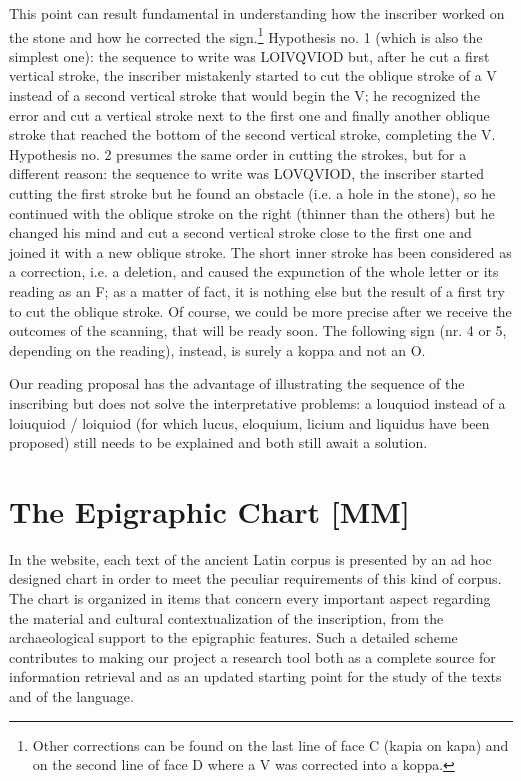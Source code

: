 \documentclass[amsthm,ebook]{saparticle}
\begin{document}
This point can result fundamental in understanding how the inscriber worked on the stone and how he corrected the
sign.\footnote{Other corrections can be found on the last line of face C (kapia on kapa) and on the second line of face
D where a V was corrected into a koppa. } Hypothesis no. 1 (which is also the simplest one): the sequence to write was
LOIVQVIOD but, after he cut a first vertical stroke, the inscriber mistakenly started to cut the oblique stroke of a V
instead of a second vertical stroke that would begin the V; he recognized the error and cut a vertical stroke next to
the first one and finally another oblique stroke that reached the bottom of the second vertical stroke, completing the
V. Hypothesis no. 2 presumes the same order in cutting the strokes, but for a different reason: the sequence to write
was LOVQVIOD, the inscriber started cutting the first stroke but he found an obstacle (i.e. a hole in the stone), so he
continued with the oblique stroke on the right (thinner than the others) but he changed his mind and cut a second
vertical stroke close to the first one and joined it with a new oblique stroke. The short inner stroke has been
considered as a correction, i.e. a deletion, and caused the expunction of the whole letter or its reading as an F; as a
matter of fact, it is nothing else but the result of a first try to cut the oblique stroke. Of course, we could be more
precise after we receive the outcomes of the scanning, that will be ready soon. The following sign (nr. 4 or 5,
depending on the reading), instead, is surely a koppa and not an O.

Our reading proposal has the advantage of illustrating the sequence of the inscribing but does not solve the
interpretative problems: a louquiod instead of a loiuquiod / loiquiod (for which lucus, eloquium, licium and liquidus
have been proposed) still needs to be explained and both still await a solution. 

\section{The Epigraphic Chart [MM]}


\noindent In the website, each text of the ancient Latin corpus is presented by an ad hoc designed chart in order to meet the
peculiar requirements of this kind of corpus. The chart is organized in items that concern every important aspect
regarding the material and cultural contextualization of the inscription, from the archaeological support to the
epigraphic features. Such a detailed scheme contributes to making our project a research tool both as a complete source
for information retrieval and as an updated starting point for the study of the texts and of the language.
\end{document}
